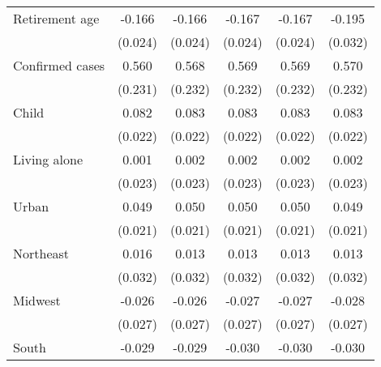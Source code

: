 {\begin{tabular}{l*{5}{c}}
\addlinespace
Retirement age      &      -0.166\sym{***}&      -0.166\sym{***}&      -0.167\sym{***}&      -0.167\sym{***}&      -0.195\sym{***}\\
                    &     (0.024)         &     (0.024)         &     (0.024)         &     (0.024)         &     (0.032)         \\
\addlinespace
Confirmed cases     &       0.560\sym{**} &       0.568\sym{**} &       0.569\sym{**} &       0.569\sym{**} &       0.570\sym{**} \\
                    &     (0.231)         &     (0.232)         &     (0.232)         &     (0.232)         &     (0.232)         \\
\addlinespace
Child               &       0.082\sym{***}&       0.083\sym{***}&       0.083\sym{***}&       0.083\sym{***}&       0.083\sym{***}\\
                    &     (0.022)         &     (0.022)         &     (0.022)         &     (0.022)         &     (0.022)         \\
\addlinespace
Living alone        &       0.001         &       0.002         &       0.002         &       0.002         &       0.002         \\
                    &     (0.023)         &     (0.023)         &     (0.023)         &     (0.023)         &     (0.023)         \\
\addlinespace
Urban               &       0.049\sym{**} &       0.050\sym{**} &       0.050\sym{**} &       0.050\sym{**} &       0.049\sym{**} \\
                    &     (0.021)         &     (0.021)         &     (0.021)         &     (0.021)         &     (0.021)         \\
\addlinespace
Northeast           &       0.016         &       0.013         &       0.013         &       0.013         &       0.013         \\
                    &     (0.032)         &     (0.032)         &     (0.032)         &     (0.032)         &     (0.032)         \\
\addlinespace
Midwest             &      -0.026         &      -0.026         &      -0.027         &      -0.027         &      -0.028         \\
                    &     (0.027)         &     (0.027)         &     (0.027)         &     (0.027)         &     (0.027)         \\
\addlinespace
South               &      -0.029         &      -0.029         &      -0.030         &      -0.030         &      -0.030         \\

\end{tabular}}
